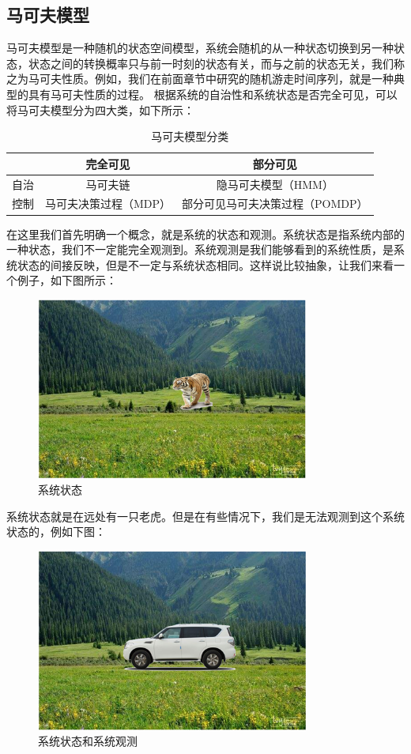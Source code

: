 \documentclass{article}
\begin{document}
\subsection{马可夫模型}
马可夫模型是一种随机的状态空间模型，系统会随机的从一种状态切换到另一种状态，状态之间的转换概率只与前一时刻的状态有关，而与之前的状态无关，我们称之为马可夫性质。例如，我们在前面章节中研究的随机游走时间序列，就是一种典型的具有马可夫性质的过程。\newline
根据系统的自治性和系统状态是否完全可见，可以将马可夫模型分为四大类，如下所示：
\begin{table}[H]
\caption{马可夫模型分类}
\label{t000003}
\begin{tabular}{|c|c|c|} \hline
 & 完全可见 & 部分可见 \\ \hline  
自治 & 马可夫链 & 隐马可夫模型（HMM） \\ \hline
控制 & 马可夫决策过程（MDP） & 部分可见马可夫决策过程（POMDP） \\ \hline
\end{tabular}
\end{table}
在这里我们首先明确一个概念，就是系统的状态和观测。系统状态是指系统内部的一种状态，我们不一定能完全观测到。系统观测是我们能够看到的系统性质，是系统状态的间接反映，但是不一定与系统状态相同。这样说比较抽象，让我们来看一个例子，如下图所示：
\begin{figure}[H]
	\caption{系统状态}
	\label{f000066}
	\centering
	\includegraphics[height=6cm]{images/f000066}
\end{figure}
系统状态就是在远处有一只老虎。但是在有些情况下，我们是无法观测到这个系统状态的，例如下图：
\begin{figure}[H]
	\caption{系统状态和系统观测}
	\label{f000067}
	\centering
	\includegraphics[height=6cm]{images/f000067}
\end{figure}
\end{document}

